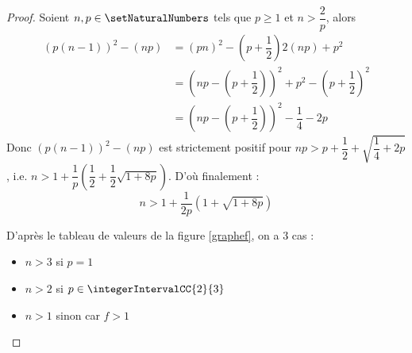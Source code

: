 \begin{proof}
Soient $n, p\in \setNaturalNumbers$ tels que $p \ge 1$ et $n > \dfrac{2}{p}$, alors
\[
\begin{aligned}
(p(n-1))^2 - (np) 
&= (pn)^2 - \left(p + \dfrac{1}{2}\right)2(np) + p^2 \\
&= \left(np - \left(p + \dfrac{1}{2}\right)\right)^2 + p^2 - \left(p + \dfrac{1}{2}\right)^2\\
&= \left(np - \left(p + \dfrac{1}{2}\right)\right)^2 - \dfrac{1}{4} - 2p
\end{aligned}
\]
Donc $(p(n-1))^2 - (np)$ est strictement positif pour $np > p + \dfrac{1}{2} + \sqrt{\dfrac{1}{4} + 2p}$, i.e. $n > 1 + \dfrac{1}{p}\left(\dfrac{1}{2} + \dfrac{1}{2}\sqrt{1 + 8p}\right)$. D'où finalement :
\[
n > 1 + \dfrac{1}{2p}\left(1 + \sqrt{1 + 8p}\right)
\]

D'après le tableau de valeurs de la figure \ref{graphef}, on a 3 cas :
\begin{itemize}
\item $n > 3$ si $p = 1$
\item $n > 2$ si $p \in \integerIntervalCC{2}{3}$
\item $n > 1$ sinon car $f > 1$
\end{itemize}

\begin{figure}[!ht]
\begin{minipage}{0.5\textwidth}
\end{minipage}
\end{figure}
\end{proof}

